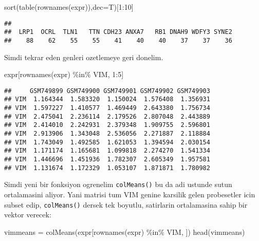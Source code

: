 \documentclass[
]{book}
\newenvironment{Shaded}{\begin{snugshade}}{\end{snugshade}}
\newcommand{\AttributeTok}[1]{\textcolor[rgb]{0.77,0.63,0.00}{#1}}
\newcommand{\DecValTok}[1]{\textcolor[rgb]{0.00,0.00,0.81}{#1}}
\newcommand{\FunctionTok}[1]{\textcolor[rgb]{0.00,0.00,0.00}{#1}}
\newcommand{\NormalTok}[1]{#1}
\newcommand{\OtherTok}[1]{\textcolor[rgb]{0.56,0.35,0.01}{#1}}
\newcommand{\SpecialCharTok}[1]{\textcolor[rgb]{0.00,0.00,0.00}{#1}}
\newcommand{\StringTok}[1]{\textcolor[rgb]{0.31,0.60,0.02}{#1}}
\begin{document}
\begin{Shaded}
\begin{Highlighting}[]
\FunctionTok{sort}\NormalTok{(}\FunctionTok{table}\NormalTok{(}\FunctionTok{rownames}\NormalTok{(expr)),}\AttributeTok{dec=}\NormalTok{T)[}\DecValTok{1}\SpecialCharTok{:}\DecValTok{10}\NormalTok{]}
\end{Highlighting}
\end{Shaded}

\begin{verbatim}
## 
##  LRP1  OCRL  TLN1   TTN CDH23 ANXA7   RB1 DNAH9 WDFY3 SYNE2 
##    88    62    55    55    41    40    40    37    37    36
\end{verbatim}

Simdi tekrar eden genleri ozetlemeye geri donelim.

\begin{Shaded}
\begin{Highlighting}[]
\NormalTok{expr[}\FunctionTok{rownames}\NormalTok{(expr) }\SpecialCharTok{\%in\%} \StringTok{\textquotesingle{}VIM\textquotesingle{}}\NormalTok{, }\DecValTok{1}\SpecialCharTok{:}\DecValTok{5}\NormalTok{]}
\end{Highlighting}
\end{Shaded}

\begin{verbatim}
##     GSM749899 GSM749900 GSM749901 GSM749902 GSM749903
## VIM  1.164344  1.583320  1.150024  1.576408  1.356931
## VIM  1.597227  1.410577  1.469449  2.643380  1.756734
## VIM  2.475041  2.236114  2.179526  2.807048  2.443889
## VIM  2.414010  2.242931  2.379348  1.909755  2.596801
## VIM  2.913906  1.343048  2.536056  2.271887  2.118884
## VIM  1.743049  1.492585  1.621053  1.394594  2.030154
## VIM  1.171174  1.165681  1.099818  2.274270  1.541334
## VIM  1.446696  1.451936  1.782307  2.605349  1.957581
## VIM  1.131674  1.172329  1.053107  1.871871  1.780982
\end{verbatim}

Simdi yeni bir fonksiyon ogrenelim \texttt{colMeans()} bu da adi ustunde sutun ortalamasini aliyor. Yani matrisi tum VIM genine karsilik gelen probesetler icin subset edip, \texttt{colMeans()} dersek tek boyutlu, satirlarin ortalamasina sahip bir vektor verecek:

\begin{Shaded}
\begin{Highlighting}[]
\NormalTok{vimmeans }\OtherTok{=} \FunctionTok{colMeans}\NormalTok{(expr[}\FunctionTok{rownames}\NormalTok{(expr) }\SpecialCharTok{\%in\%} \StringTok{\textquotesingle{}VIM\textquotesingle{}}\NormalTok{, ])}
\FunctionTok{head}\NormalTok{(vimmeans)}
\end{Highlighting}
\end{Shaded}
\end{document}
